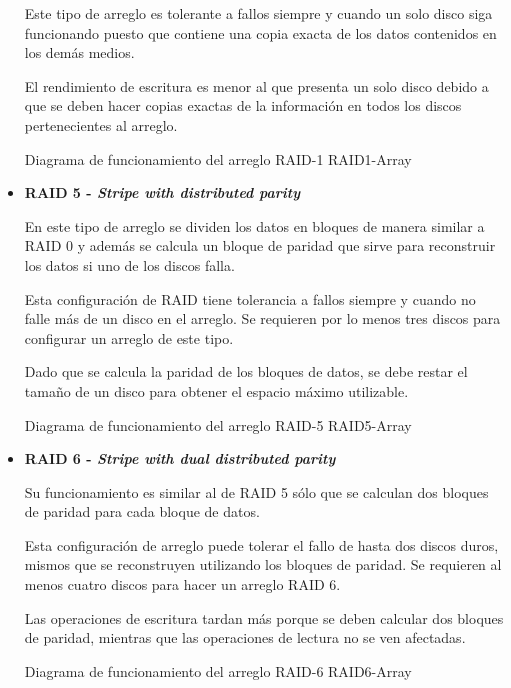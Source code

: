 \begin{itemize}
Este tipo de arreglo es tolerante a fallos siempre y cuando un solo disco siga funcionando puesto que contiene una copia exacta de los datos contenidos en los dem\'{a}s medios.

El rendimiento de escritura es menor al que presenta un solo disco debido a que se deben hacer copias exactas de la informaci\'{o}n en todos los discos pertenecientes al arreglo.

\diagramblock
{Diagrama de funcionamiento del arreglo \textsc{RAID-1}}
{RAID1-Array}
{
 {
  
 }
}
\newpage
  \item \textbf{RAID 5 - \textit{Stripe with distributed parity}}

En este tipo de arreglo se dividen los datos en bloques de manera similar a \textsc{RAID} 0 y adem\'{a}s se calcula un bloque de paridad que sirve para reconstruir los datos si uno de los discos falla.

Esta configuraci\'{o}n de \textsc{RAID} tiene tolerancia a fallos siempre y cuando no falle m\'{a}s de un disco en el arreglo. Se requieren por lo menos tres discos para configurar un arreglo de este tipo.

Dado que se calcula la paridad de los bloques de datos, se debe restar el tama\~{n}o de un disco para obtener el espacio m\'{a}ximo utilizable.

\diagramblock
{Diagrama de funcionamiento del arreglo \textsc{RAID-5}}
{RAID5-Array}
{
 {
  
 }
}
\newpage
  \item \textbf{RAID 6 - \textit{Stripe with \textsl{dual} distributed parity}}

Su funcionamiento es similar al de \textsc{RAID} 5 s\'{o}lo que se calculan dos bloques de paridad para cada bloque de datos.

Esta configuraci\'{o}n de arreglo puede tolerar el fallo de hasta dos discos duros, mismos que se reconstruyen utilizando los bloques de paridad. Se requieren al menos cuatro discos para hacer un arreglo \textsc{RAID} 6.

Las operaciones de escritura tardan m\'{a}s porque se deben calcular dos bloques de paridad, mientras que las operaciones de lectura no se ven afectadas.

\diagramblock
{Diagrama de funcionamiento del arreglo \textsc{RAID-6}}
{RAID6-Array}
{
 {
  
 }
}

\end{itemize}

